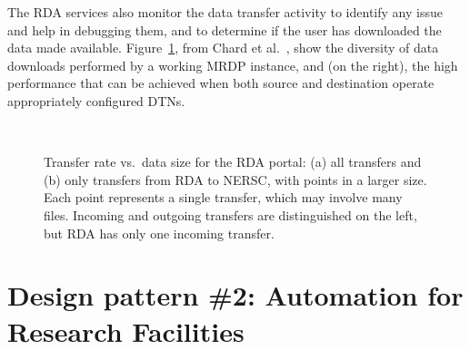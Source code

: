 \documentclass[10pt]{article}
\begin{document}
The RDA services also monitor the data transfer activity to identify any issue and help in debugging them, and to determine if the user has downloaded the data made available. 
Figure~\ref{fig:sizetime}, from Chard et al.~\cite{BMRDP}, show the diversity of data downloads
performed by a working MRDP instance, and (on the right), the high performance that can be
achieved when both source and destination operate appropriately configured DTNs. 

  \begin{figure}[t]
  \centering
    \\

  \vspace{1ex}
  
\caption{Transfer rate vs.\ data size for the RDA portal:
(a) all transfers and 
(b) only transfers from RDA to NERSC, with points 
in a larger size.
Each point represents a single transfer, which may involve many files.
Incoming and outgoing transfers are distinguished on the left, but
RDA has only one incoming transfer.
}
\label{fig:sizetime}
\end{figure}



\section*{Design pattern \#2: Automation for Research Facilities}
\end{document}
